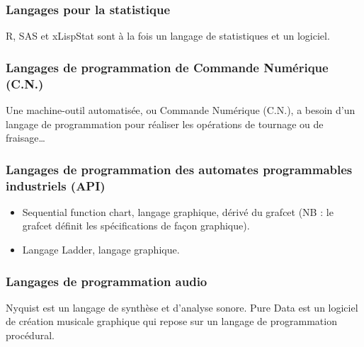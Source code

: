 \documentclass[a4paper,12pt]{article}
\begin{document}
\subsubsection{Langages pour la statistique}

R, SAS et xLispStat sont à la fois un langage de statistiques et un logiciel.

\subsubsection{Langages de programmation de Commande Numérique (C.N.)}

Une machine-outil automatisée, ou Commande Numérique (C.N.), a besoin d'un langage de programmation pour réaliser les opérations de tournage ou de fraisage…

\subsubsection{Langages de programmation des automates programmables  industriels (API)}

\begin{itemize}[label=\textbullet]

\item Sequential function chart, langage graphique, dérivé du grafcet (NB : le grafcet définit les spécifications de façon graphique).
\item Langage Ladder, langage graphique.
    
\end{itemize}

\subsubsection{Langages de programmation audio}

Nyquist est un langage de synthèse et d'analyse sonore. Pure Data est un logiciel de création musicale graphique qui repose sur un langage de programmation procédural.

\newpage
\end{document}
